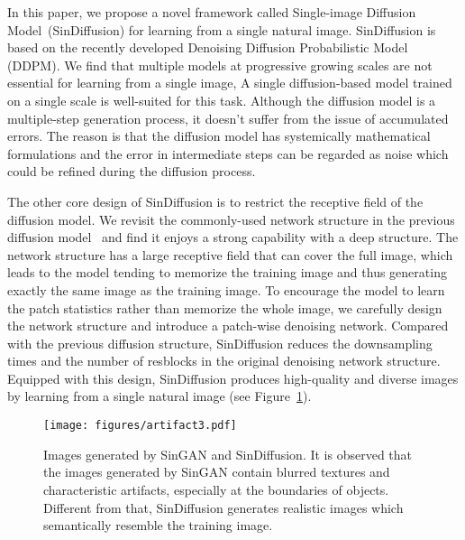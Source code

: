 \documentclass[10pt,twocolumn,letterpaper]{article}
\begin{document}
In this paper, we propose a novel framework called Single-image Diffusion Model~(SinDiffusion) for learning from a single natural image. SinDiffusion is based on the recently developed Denoising Diffusion Probabilistic Model (DDPM). We find that multiple models at progressive growing scales are not essential for learning from a single image, 
A single diffusion-based model trained on a single scale is well-suited for this task. Although the diffusion model is a multiple-step generation process, it doesn't suffer from the issue of accumulated errors. The reason is that the diffusion model has systemically mathematical formulations and the error in intermediate steps can be regarded as noise which could be refined during the diffusion process. 

The other core design of SinDiffusion is to restrict the receptive field of the diffusion model.
We revisit the commonly-used network structure in the previous diffusion model~\cite{dhariwal2021diffusion} and find it enjoys a strong capability with a deep structure. The network structure has a large receptive field that can cover the full image, which leads to the model tending to memorize the training image and thus generating exactly the same image as the training image.
To encourage the model to learn the patch statistics rather than memorize the whole image, we carefully design the network structure and introduce a patch-wise denoising network.
Compared with the previous diffusion structure, SinDiffusion reduces the downsampling times and the number of resblocks in the original denoising network structure. Equipped with this design, SinDiffusion produces high-quality and diverse images by learning from a single natural image (see Figure~\ref{fig:artifact}).

\begin{figure}[t]
  \centering
   \texttt{[image: figures/artifact3.pdf]}
   \vspace{-6mm}
   \caption{
   Images generated by SinGAN and SinDiffusion.
   It is observed that the images generated by SinGAN contain blurred textures and characteristic artifacts, especially at the boundaries of objects.
   Different from that, SinDiffusion generates realistic images which semantically resemble the training image.
   }
   \vspace{-5mm}
   \label{fig:artifact}
\end{figure}
\end{document}
